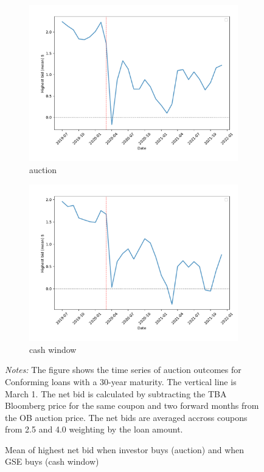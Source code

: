 \documentclass[11pt,a4paper]{article}
\begin{document}
\begin{figure}[h]
  \centering
     \begin{subfigure}[b]{0.49\textwidth} 
      \includegraphics[width=0.998\textwidth]{../results/figures/w_winner_bid_mean_n_mat30_loan1_timeseries_nrmonthly_2.5_4_auction_netbid.pdf}
      \caption{ auction}
     \end{subfigure}
     \begin{subfigure}[b]{0.49\textwidth}
      \includegraphics[width=0.998\textwidth]{../results/figures/w_winner_bid_mean_n_mat30_loan1_timeseries_nrmonthly_2.5_4_cash_window_netbid.pdf}
      \caption{cash window}
     \end{subfigure}
   \caption{Mean of highest net bid when investor buys (auction) and when GSE buys (cash window)} 
   \begin{minipage}{\textwidth}
      \footnotesize{\textit{Notes:} The figure shows the time series of auction outcomes for Conforming loans with a 30-year maturity.  The vertical line is March 1. The net bid is calculated by subtracting the TBA Bloomberg price for the same coupon and two forward months from the OB auction price. 
      The net bids are averaged accross coupons from 2.5 and 4.0 weighting by the loan amount. }
      \end{minipage}
\end{figure}
\end{document}
